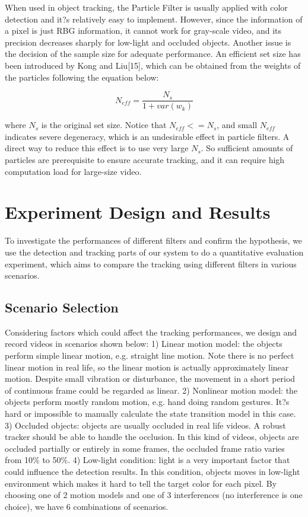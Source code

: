 \documentclass[10pt,twocolumn,letterpaper]{article}
\begin{document}
When used in object tracking, the Particle Filter is usually applied with color detection and it?s relatively easy to implement. However, since the information of a pixel is just RBG information, it cannot work for gray-scale video, and its precision decreases sharply for low-light and occluded objects. Another issue is the decision of the sample size for adequate performance. An efficient set size has been introduced by Kong and Liu[15], which can be obtained from the weights of the particles following the equation below:

\begin{equation}
N_{eff}=\frac{N_s}{1+var(w_k)}
\end{equation}

where $N_s$ is the original set size. Notice that $N_{eff}<=N_s$, and small $N_{eff}$ indicates severe degeneracy, which is an undesirable effect in particle filters. A direct way to reduce this effect is to use very large $N_s$. So sufficient amounts of particles are prerequisite to ensure accurate tracking, and it can require high computation load for large-size video.

\section{Experiment Design and Results}

To investigate the performances of different filters and confirm the hypothesis, we use the detection and tracking parts of our system to do a quantitative evaluation experiment, which aims to compare the tracking using different filters in various scenarios.

\subsection{Scenario Selection}

Considering factors which could affect the tracking performances, we design and record videos in scenarios shown below:
1) Linear motion model: the objects perform simple linear motion, e.g. straight line motion. Note there is no perfect linear motion in real life, so the linear motion is actually approximately linear motion. Despite small vibration or disturbance, the movement in a short period of continuous frame could be regarded as linear.
2) Nonlinear motion model: the objects perform mostly random motion, e.g. hand doing random gestures. It?s hard or impossible to manually calculate the state transition model in this case.
3) Occluded objects: objects are usually occluded in real life videos. A robust tracker should be able to handle the occlusion. In this kind of videos, objects are occluded partially or entirely in some frames, the occluded frame ratio varies from 10\% to 50\%.
4) Low-light condition: light is a very important factor that could influence the detection results. In this condition, objects moves in low-light environment which makes it hard to tell the target color for each pixel.
By choosing one of 2 motion models and one of 3 interferences (no interference is one choice), we have 6 combinations of scenarios.
\end{document}

